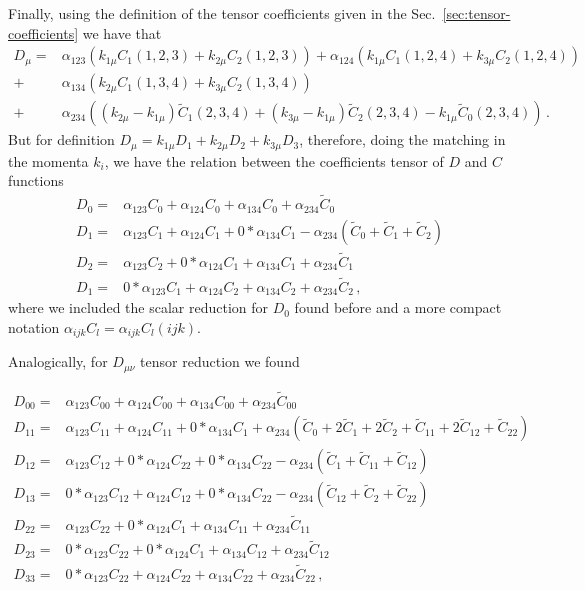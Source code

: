 Finally, using the definition of the tensor coefficients given in the Sec.~\ref{sec:tensor-coefficients} we have that
%
\begin{align}
D_{\mu}=&\alpha_{123}\left(k_{1\mu}C_1(1,2,3)+k_{2\mu}C_2(1,2,3)\right)
+\alpha_{124}\left(k_{1\mu}C_1(1,2,4)+k_{3\mu}C_2(1,2,4)\right)\nonumber \\
+&\alpha_{134}\left(k_{2\mu}C_1(1,3,4)+k_{3\mu}C_2(1,3,4)\right)\nonumber \\
+&\alpha_{234}\left((k_{2\mu}-k_{1\mu})\tilde{C}_1(2,3,4)+(k_{3\mu}-k_{1\mu})\tilde{C}_2(2,3,4)-k_{1\mu}\tilde{C}_0(2,3,4)\right)\,.
\end{align}
%
But for definition $D_{\mu}=k_{1\mu}D_1+k_{2\mu}D_2+k_{3\mu}D_3$, therefore, doing the matching in the momenta $k_i$, we have the relation between the coefficients tensor of $D$ and $C$ functions
\begin{align}
\label{eq:Di-reduction}
D_0=& \alpha_{123}C_0+\alpha_{124}C_0+\alpha_{134}C_0+\alpha_{234}\tilde{C}_0\nonumber \\
D_1=&\alpha_{123}C_1+\alpha_{124}C_1+0*\alpha_{134}C_1-\alpha_{234}\left(\tilde{C}_0+\tilde{C}_1+\tilde{C}_2\right)\nonumber \\
D_2=&\alpha_{123}C_2+0*\alpha_{124}C_1+\alpha_{134}C_1+\alpha_{234}\tilde{C}_1\nonumber \\
D_1=&0*\alpha_{123}C_1+\alpha_{124}C_2+\alpha_{134}C_2+\alpha_{234}\tilde{C}_2\,,
\end{align}
where we included the scalar reduction for $D_0$ found before and a more compact notation $\alpha_{ijk}C_l=\alpha_{ijk}C_l(ijk)$.

Analogically, for $D_{\mu\nu}$ tensor reduction we found

\begin{align}
\label{eq:Dij-reduction}
D_{00}=& \alpha_{123}C_{00}+\alpha_{124}C_{00}+\alpha_{134}C_{00}+\alpha_{234}\tilde{C}_{00}\nonumber \\
D_{11}=&\alpha_{123}C_{11}+\alpha_{124}C_{11}+0*\alpha_{134}C_1+\alpha_{234}\left(\tilde{C}_0+2\tilde{C}_1+2\tilde{C}_2+\tilde{C}_{11}+2\tilde{C}_{12}+\tilde{C}_{22}\right)\nonumber \\
D_{12}=&\alpha_{123}C_{12}+0*\alpha_{124}C_{22}+0*\alpha_{134}C_{22}-\alpha_{234}\left(\tilde{C}_{1}+\tilde{C}_{11}+\tilde{C}_{12}\right)\nonumber\\
D_{13}=&0*\alpha_{123}C_{12}+\alpha_{124}C_{12}+0*\alpha_{134}C_{22}-\alpha_{234}\left(\tilde{C}_{12}+\tilde{C}_{2}+\tilde{C}_{22}\right)\nonumber\\
D_{22}=&\alpha_{123}C_{22}+0*\alpha_{124}C_1+\alpha_{134}C_{11}+\alpha_{234}\tilde{C}_{11}\nonumber \\
D_{23}=&0*\alpha_{123}C_{22}+0*\alpha_{124}C_1+\alpha_{134}C_{12}+\alpha_{234}\tilde{C}_{12}\nonumber \\
D_{33}=&0*\alpha_{123}C_{22}+\alpha_{124}C_{22}+\alpha_{134}C_{22}+\alpha_{234}\tilde{C}_{22}\,,
\end{align}

